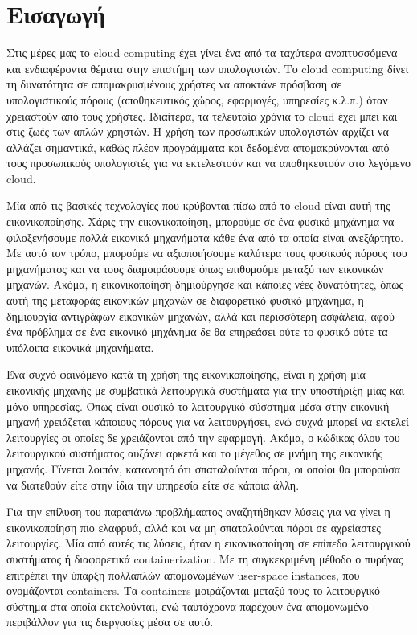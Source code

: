 \chapter{Εισαγωγή}
Στις μέρες μας το cloud computing έχει γίνει ένα από τα ταχύτερα αναπτυσσόμενα
και ενδιαφέροντα θέματα στην επιστήμη των υπολογιστών. Το cloud computing δίνει
τη δυνατότητα σε απομακρυσμένους χρήστες να αποκτάνε πρόσβαση σε υπολογιστικούς
πόρους (αποθηκευτικός χώρος, εφαρμογές, υπηρεσίες κ.λ.π.) όταν χρειαστούν από
τους χρήστες. Ιδιαίτερα, τα τελευταία χρόνια το cloud έχει μπει και στις ζωές
των απλών χρηστών. H χρήση των προσωπικών υπολογιστών αρχίζει να αλλάζει
σημαντικά, καθώς πλέον προγράμματα και δεδομένα απομακρύνονται από τους 
προσωπικούς υπολογιστές για να εκτελεστούν και να αποθηκευτούν στο λεγόμενο
cloud. 

Μία από τις βασικές τεχνολογίες που κρύβονται πίσω από το cloud είναι αυτή της
εικονικοποίησης. Χάρις την εικονικοποίηση, μπορούμε σε ένα φυσικό μηχάνημα να
φιλοξενήσουμε πολλά εικονικά μηχανήματα κάθε ένα από τα οποία είναι ανεξάρτητο.
Με αυτό τον τρόπο, μπορούμε να αξιοποιήσουμε καλύτερα τους φυσικούς πόρους του
μηχανήματος και να τους διαμοιράσουμε όπως επιθυμούμε μεταξύ των εικονικών
μηχανών. Ακόμα, η εικονικοποίηση δημιούργησε και κάποιες νέες δυνατότητες, όπως
αυτή της μεταφοράς εικονικών μηχανών σε διαφορετικό φυσικό μηχάνημα, η
δημιουργία αντιγράφων εικονικών μηχανών, αλλά και περισσότερη ασφάλεια, αφού ένα
πρόβλημα σε ένα εικονικό μηχάνημα δε θα επηρεάσει ούτε το φυσικό ούτε τα
υπόλοιπα εικονικά μηχανήματα. 

Ένα συχνό φαινόμενο κατά τη χρήση της εικονικοποίησης, είναι η χρήση μία
εικονικής μηχανής με συμβατικά λειτουργικά συστήματα για την υποστήριξη μίας και
μόνο υπηρεσίας. Όπως είναι φυσικό το λειτουργικό σύσστημα μέσα στην εικονική
μηχανή χρειάζεται κάποιους πόρους για να λειτουργήσει, ενώ συχνά μπορεί να
εκτελεί λειτουργίες οι οποίες δε χρειάζονται από την εφαρμογή. Ακόμα, ο κώδικας
όλου του λειτουργικού συστήματος αυξάνει αρκετά και το μέγεθος σε μνήμη της
εικονικής μηχανής. Γϊνεται λοιπόν, κατανοητό ότι σπαταλούνται πόροι, οι οποίοι
θα μπορούσα να διατεθούν είτε στην ίδια την υπηρεσία είτε σε κάποια άλλη. 

Για την επίλυση του παραπάνω προβλήμαατος αναζητήθηκαν λύσεις για να γίνει η
εικονικοποίηση πιο ελαφρυά, αλλά και να μη σπαταλούνται πόροι σε αχρείαστες
λειτουργίες. Μία από αυτές τις λύσεις, ήταν η εικονικοποίηση σε επίπεδο
λειτουργικού συστήματος ή διαφορετικά containerization. Με τη συγκεκριμένη
μέθοδο ο πυρήνας επιτρέπει την ύπαρξη πολλαπλών απομονωμένων user-space
instances, που ονομάζονται containers. Τα containers μοιράζονται μεταξύ τους το
λειτουργικό σύστημα στα οποία εκτελούνται, ενώ ταυτόχρονα παρέχουν ένα
απομονωμένο περιβάλλον για τις διεργασίες μέσα σε αυτό. 

